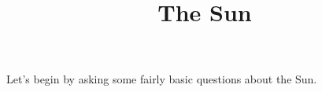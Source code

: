 \documentclass{../template/texnote}
\title{The Sun}
\begin{document}
    \maketitle {}
Let's begin by asking some fairly basic questions about the Sun.
\end{document}
